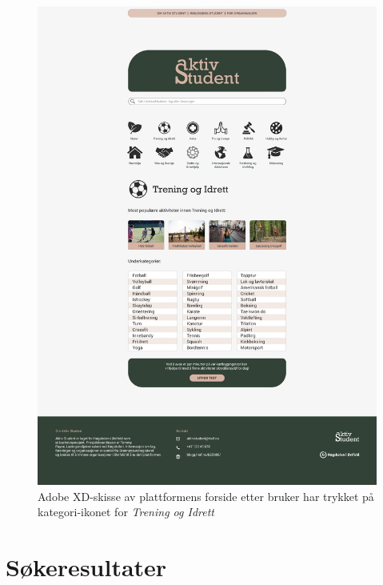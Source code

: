 \begin{figure}[H]
\centering
\includegraphics[width=.9\textwidth]{Illustrasjoner/Skisser-pdf/3.0/3-2-forside-trykket-kategori.pdf}
\caption{Adobe XD-skisse av plattformens forside etter bruker har trykket på kategori-ikonet for {\em Trening og Idrett}}
\label{vedlegg:3-2-forside-utbrett}
\end{figure}

\section{Søkeresultater}

